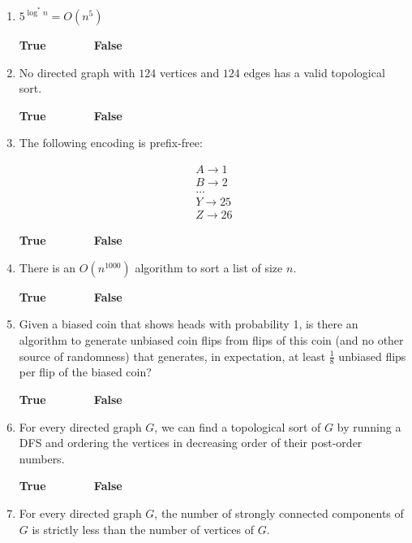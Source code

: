 \documentclass[11pt]{article}
\begin{document}
\begin{enumerate}
    \item $5^{\log^*n} = O(n^5)$
    
    \medskip 
    
    \textbf{True \, \, \, \, \, \, \, False}
    
    
    \item No directed graph with $124$ vertices and $124$ edges has a valid topological sort.
    
    \medskip 
    
    \textbf{True \, \, \, \, \, \, \, False}
    
    \item The following encoding is prefix-free:
    
    $$
    \begin{array}{c}
        A \rightarrow 1  \\
        B \rightarrow 2 \\
        \ldots \\
        Y \rightarrow 25 \\
        Z \rightarrow 26
    \end{array}$$
    
    \medskip 
    
    \textbf{True \, \, \, \, \, \, \, False}
    
    \item There is an $O(n^{1000})$ algorithm to sort a list of size $n$.
    
    \medskip 
    
    \textbf{True \, \, \, \, \, \, \, False}
    
\item Given a biased coin that shows heads with probability 1, is there an algorithm to generate unbiased coin flips from flips of this coin (and no other source of randomness) that generates, in expectation, at least $\frac{1}{8}$ unbiased flips per flip of the biased coin?

\medskip 

\textbf{True \, \, \, \, \, \, \, False}

\item
For every directed graph $G$, we can find a topological sort of $G$ by running a DFS and ordering the vertices in decreasing order of their post-order numbers. 
    \medskip 
    
    \textbf{True \, \, \, \, \, \, \, False}
\item
For every directed graph $G$, the number of strongly connected components of $G$ is strictly less than the number of vertices of $G$. 
    \medskip 
    

\end{enumerate}
\end{document}
